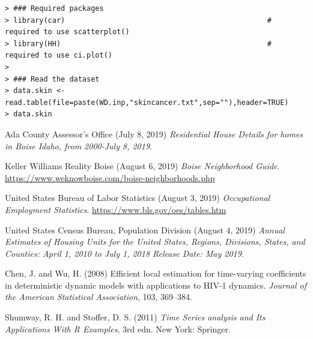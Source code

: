 \documentclass{article}
\begin{document}
{\footnotesize
\begin{verbatim}
> ### Required packages
> library(car)                                               # required to use scatterplot()
> library(HH)                                                # required to use ci.plot()
>
> ### Read the dataset
> data.skin <- read.table(file=paste(WD.inp,"skincancer.txt",sep=""),header=TRUE)
> data.skin
\end{verbatim}
}
\newpage
\begin{thebibliography}{3}

Ada County Assessor's Office (July 8, 2019)
\newblock \textit{Residential House Details for homes in Boise Idaho, from 2000-July 8, 2019}.


Keller Williams Reality Boise (August 6, 2019)
\newblock \textit{Boise Neighborhood Guide}.
\newblock \url{https://www.weknowboise.com/boise-neighborhoods.php}


United States Bureau of Labor Statistics (August 3, 2019)
\newblock \textit{Occupational Employment Statistics}.
\newblock \url{https://www.bls.gov/oes/tables.htm}

United States Census Bureau, Population Division (August 4, 2019)
\newblock \textit{Annual Estimates of Housing Units for the United States, Regions, Divisions, States, and Counties: April 1, 2010 to July 1, 2018 Release Date: May 2019}.





Chen, J. and Wu, H. (2008)
\newblock Efficient local estimation for time-varying coefficients in
deterministic dynamic models with applications to {HIV}-1 dynamics.
\newblock \textit{Journal of the American Statistical Association}, 103, 369--384.

Shumway, R. H. and Stoffer, D. S. (2011)
\newblock \textit{Time Series analysis and Its Applications With R Examples}, 3rd edn.
\newblock New York: Springer.
\end{thebibliography}
\end{document}
